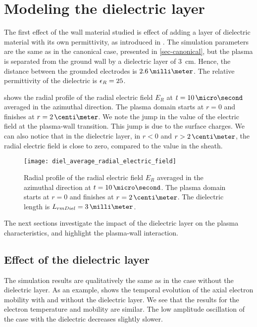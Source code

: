 
\section{Modeling the dielectric layer }
  \label{sec-diel_layer}
  
  The first effect of the wall material studied is effect of adding a layer of dielectric material with its own permittivity, as introduced in .
  The simulation parameters are the same as in the canonical case, presented in \cref{sec-canonical}, but the plasma is separated from the ground wall by a dielectric layer of 3~cm.
  Hence, the distance between the grounded electrodes is $2.6\,\milli\meter$.
  The relative permittivity of the dielectric is $\epsilon_{R}=25$.
  
   shows the radial profile of the radial electric field $E_R$ at $t=10\,\micro\second$ averaged in the azimuthal direction.
  The plasma domain starts at $r=0$ and finishes at $r=2\,\centi\meter$.
  We note the jump in the value of the electric field at the plasma-wall transition.
  This jump is due to the surface charges.
  We can also notice that in the dielectric layer, in $r < 0$ and $r > 2\,\centi\meter$, the radial electric field is close to zero, compared to the value in the sheath.
  
  \begin{figure}[hbt]
    \centering
    \texttt{[image: diel\_average\_radial\_electric\_field]}
    \caption{Radial profile of the radial electric field $E_R$ averaged in the azimuthal direction at $t=10\,\micro\second$. The plasma domain starts at $r=0$ and finishes at $r=2\,\centi\meter$. The dielectric length is $L_{\\rm Diel} = 3\,\milli\meter$.  }
    \label{fig-diel_radial_Er}
  \end{figure}
  
  The next sections investigate the impact of the dielectric layer on the plasma characteristics, and highlight the plasma-wall interaction.
  
  \subsection{Effect of the dielectric layer} \label{subsec-effect_mob}
    
  
  The simulation results are qualitatively the same as in the case without the dielectric layer.
  As an example,  shows the temporal evolution of the axial electron mobility with and without the dielectric layer.
  We see that the results for the electron temperature and mobility are similar.
  The low amplitude oscillation of the case with the dielectric decreases slightly slower.
  
